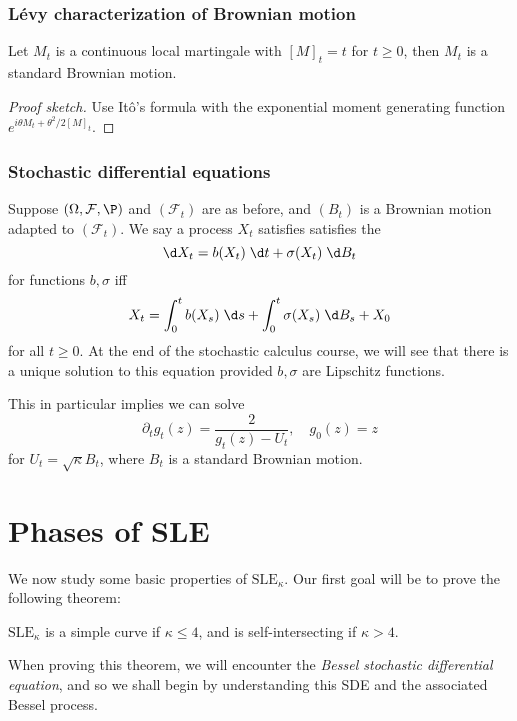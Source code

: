 \documentclass[a4paper]{article}
\newcommand\SLE{\mathrm{SLE}}
\begin{document}
\subsubsection*{L\'evy characterization of Brownian motion}
\begin{thm}
  Let $M_t$ is a continuous local martingale with $[M]_t = t$ for $t \geq 0$, then $M_t$ is a standard Brownian motion.
\end{thm}

\begin{proof}[Proof sketch]
  Use It\^o's formula with the exponential moment generating function $e^{i\theta M_t + \theta^2/2 [M]_t}$.
\end{proof}

\subsubsection*{Stochastic differential equations}
Suppose $(\Omega, \mathcal{F}, \P)$ and $(\mathcal{F}_t)$ are as before, and $(B_t)$ is a Brownian motion adapted to $(\mathcal{F}_t)$. We say a process $X_t$ satisfies satisfies the 
\[
  \d X_t = b(X_t) \;\d t + \sigma(X_t) \;\d B_t
\]
for functions $b, \sigma$ iff
\[
  X_t = \int_0^t b(X_s) \;\d s + \int_0^t \sigma(X_s) \;\d B_s + X_0
\]
for all $t \geq 0$. At the end of the stochastic calculus course, we will see that there is a unique solution to this equation provided $b, \sigma$ are Lipschitz functions.

This in particular implies we can solve
\[
  \partial_t g_t(z) = \frac{2}{g_t(z) - U_t},\quad g_0(z) = z
\]
for $U_t = \sqrt{\kappa} B_t$, where $B_t$ is a standard Brownian motion.

\section{Phases of SLE}
We now study some basic properties of $\SLE_\kappa$. Our first goal will be to prove the following theorem:
\begin{thm}
  $\SLE_\kappa$ is a simple curve if $\kappa \leq 4$, and is self-intersecting if $\kappa > 4$.
\end{thm}

When proving this theorem, we will encounter the \emph{Bessel stochastic differential equation}, and so we shall begin by understanding this SDE and the associated Bessel process.
\end{document}
